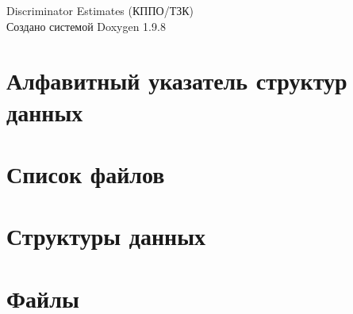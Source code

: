 \documentclass[twoside]{book}
\newcommand{\+}{\discretionary{\mbox{\scriptsize$\hookleftarrow$}}{}{}}
\newcommand{\clearemptydoublepage}{%
    \newpage{\pagestyle{empty}\cleardoublepage}%
  }
\begin{document}
  \raggedbottom
    \hypersetup{pageanchor=false,
                bookmarksnumbered=true,
                pdfencoding=unicode
               }
  \begin{titlepage}
  \vspace*{7cm}
  \begin{center}%
  {\Large Discriminator Estimates (КППО/ТЗК)}\\
  \vspace*{1cm}
  {\large Создано системой Doxygen 1.9.8}\\
  \end{center}
  \end{titlepage}
  \clearemptydoublepage
  \tableofcontents
  \clearemptydoublepage
  \hypersetup{pageanchor=true}

\chapter{Алфавитный указатель структур данных}

\chapter{Список файлов}

\chapter{Структуры данных}


\chapter{Файлы}




































  \backmatter
  \newpage
  \clearemptydoublepage
  \printindex
\end{document}
